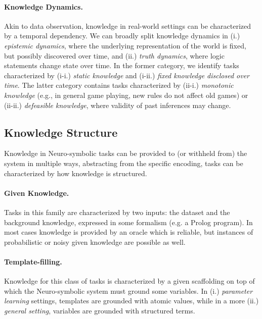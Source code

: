 \paragraph{Knowledge Dynamics.} Akin to data observation, knowledge in real-world settings can be characterized by a temporal dependency.
We can broadly split knowledge dynamics in (i.) \textit{epistemic dynamics}, where the underlying representation of the world is fixed, but possibly discovered over time, and (ii.) \textit{truth dynamics}, where logic statements change state over time.
%
In the former category, we identify tasks characterized by (i-i.) \textit{static knowledge} and (i-ii.) \textit{fixed knowledge disclosed over time}. %
The latter category contains tasks characterized by (ii-i.) \textit{monotonic knowledge} (e.g., in general game playing, new rules do not affect old games) or  (ii-ii.) \textit{defeasible knowledge}, where validity of past inferences may change.

\subsection{Knowledge Structure}
Knowledge in Neuro-symbolic tasks can be provided to (or withheld from) the system in multiple ways, abstracting from the specific encoding, tasks can be characterized by how knowledge is structured. %

\paragraph{Given Knowledge.} Tasks in this family are characterized by two inputs: the dataset and the background knowledge, expressed in some formalism (e.g. a Prolog program). In most cases knowledge is provided by an oracle which is reliable, but instances of probabilistic or noisy given knowledge are possible as well.

\paragraph{Template-filling.} Knowledge for this class of tasks is characterized by a given scaffolding on top of which the Neuro-symbolic system must ground some variables. %
In (i.) \textit{parameter learning} settings, templates are grounded with atomic values, while in a more (ii.) \textit{general setting}, variables are grounded with structured terms.

